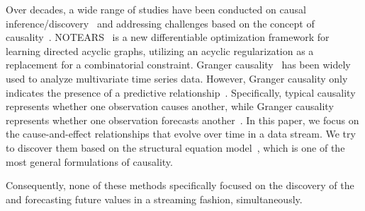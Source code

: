 \par
{}
Over decades,
a wide range of studies have been conducted on
causal inference/discovery~\cite{
shimizu2006linear,
he2021daring,
fujiwara2023causal,
jiang2023cfgode,
liu2023discovering} and 
addressing challenges based on the concept of causality~\cite{
richens2020improving,
dai2022graph,
wu2023causal}.
NOTEARS~\cite{zheng2018dags} is a new differentiable optimization framework for learning directed acyclic graphs, utilizing an acyclic regularization as a replacement for a combinatorial constraint.
Granger causality~\cite{granger1969investigating} has been widely used to analyze multivariate time series data.
However, Granger causality only indicates the presence of a predictive relationship~\cite{peters2017elements}.
Specifically, typical causality represents whether one observation causes another, while Granger causality represents whether one observation forecasts another~\cite{granger2014forecasting}.
In this paper, we focus on the cause-and-effect relationships that evolve over time in a data stream.
We try to discover them based on the structural equation model~\cite{pearl2009causality}, which is one of the most general formulations of causality.
\par
Consequently, none of these methods specifically 
focused on the discovery of the \relation
and forecasting future values in a streaming fashion, simultaneously.
